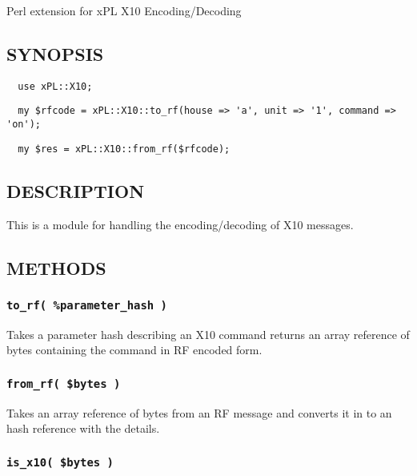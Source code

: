\documentclass[12pt,a4paper]{article}
\begin{document}
Perl extension for xPL X10 Encoding/Decoding

\subsection*{SYNOPSIS\label{xPL::X10_SYNOPSIS}}
\begin{verbatim}
  use xPL::X10;
\end{verbatim}
\begin{verbatim}
  my $rfcode = xPL::X10::to_rf(house => 'a', unit => '1', command => 'on');
\end{verbatim}
\begin{verbatim}
  my $res = xPL::X10::from_rf($rfcode);
\end{verbatim}
\subsection*{DESCRIPTION\label{xPL::X10_DESCRIPTION}}


This is a module for handling the encoding/decoding of X10 messages.

\subsection*{METHODS\label{xPL::X10_METHODS}}
\subsubsection*{\texttt{to\_rf( \%parameter\_hash )}\label{xPL::X10_to_rf_parameter_hash_}}


Takes a parameter hash describing an X10 command returns an array
reference of bytes containing the command in RF encoded form.

\subsubsection*{\texttt{from\_rf( \$bytes )}\label{xPL::X10_from_rf_bytes_}}


Takes an array reference of bytes from an RF message and converts it
in to an hash reference with the details.

\subsubsection*{\texttt{is\_x10( \$bytes )}\label{xPL::X10_is_x10_bytes_}}
\end{document}

